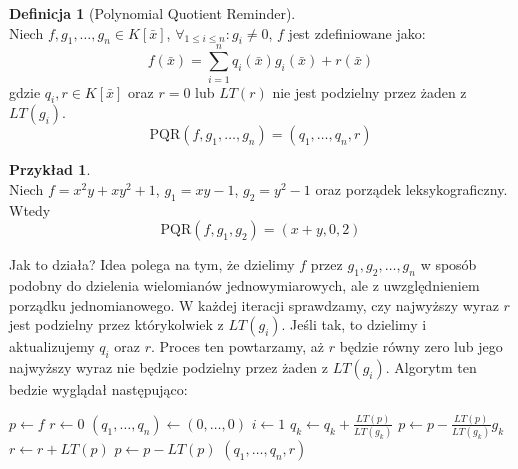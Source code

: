 \documentclass[11pt,a4paper]{article}
\theoremstyle{definition}
\newtheorem{definicja}[twierdzenie]{Definicja}
\newtheorem{przyklad}[twierdzenie]{Przykład}
\theoremstyle{remark}
\begin{document}
\begin{definicja}[Polynomial Quotient Reminder]~\\
    Niech $f, g_1, \dots, g_n \in K[\bar{x}]$, $\forall_{1\leq i \leq n}: g_i \neq 0$, $f$ jest zdefiniowane jako:
    \[
        f(\bar{x}) = \sum_{i=1}^n q_i(\bar{x})g_i(\bar{x}) + r(\bar{x})
    \]
    gdzie $q_i, r \in K[\bar{x}]$ oraz $r = 0$ lub $LT(r)$ nie jest podzielny przez żaden z $LT(g_i)$.
    \[
        \text{PQR}(f, g_1, \dots, g_n) = (q_1, \dots, q_n, r)
    \]
\end{definicja}
\begin{przyklad}~\\
    Niech $f = x^2y + xy^2 + 1$, $g_1 = xy - 1$, $g_2 = y^2 - 1$ oraz porządek leksykograficzny. Wtedy
    \[
        \text{PQR}(f, g_1, g_2) = (x+y, 0, 2)
    \]
\end{przyklad}

Jak to działa? Idea polega na tym, że dzielimy $f$ przez $g_1, g_2, \dots, g_n$ w sposób podobny do dzielenia wielomianów jednowymiarowych, ale z uwzględnieniem porządku jednomianowego. W każdej iteracji sprawdzamy, czy najwyższy wyraz $r$ jest podzielny przez którykolwiek z $LT(g_i)$. Jeśli tak, to dzielimy i aktualizujemy $q_i$ oraz $r$. Proces ten powtarzamy, aż $r$ będzie równy zero lub jego najwyższy wyraz nie będzie podzielny przez żaden z $LT(g_i)$.
Algorytm ten bedzie wyglądał następująco:
\begin{algorithm}
    \caption{Polynomial Reduce}
    \begin{algorithmic}[1]
         
        \State $p \gets f$
        \State $r \gets 0$
        \State $(q_1, \dots, q_n) \gets (0, \dots, 0)$
        \State $i \gets 1$
                \State $q_k \gets q_k + \frac{LT(p)}{LT(g_k)}$
                \State $p \gets p - \frac{LT(p)}{LT(g_k)}g_k$
            \Else
                \State $r \gets r + LT(p)$
                \State $p \gets p - LT(p)$
            \EndIf
        \EndWhile
        \State \Return $(q_1, \dots, q_n, r)$
        \EndProcedure
    \end{algorithmic}
\end{algorithm}
\end{document}
